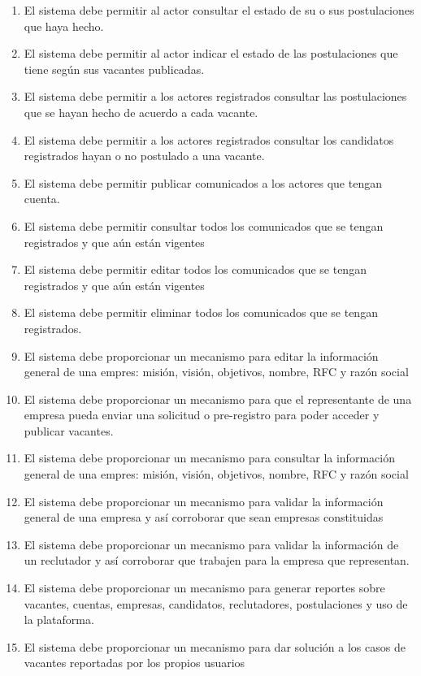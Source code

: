 \begin{enumerate}
        \item El sistema debe permitir al actor consultar el estado de su o sus postulaciones que haya hecho.
        \item El sistema debe permitir al actor indicar  el estado de las postulaciones que tiene según sus vacantes publicadas.
        \item El sistema debe permitir a los actores registrados consultar las postulaciones que se hayan hecho de acuerdo a cada vacante.
        \item El sistema debe permitir a los actores registrados consultar los candidatos registrados hayan o no postulado a una vacante.
        \item El sistema debe permitir publicar comunicados a los actores que tengan cuenta. 
        \item El sistema debe permitir consultar todos los comunicados que se tengan registrados y que aún están vigentes
        \item El sistema debe permitir editar todos los comunicados que se tengan registrados y que aún están vigentes
        \item El sistema debe permitir eliminar todos los comunicados que se tengan registrados.
        \item El sistema debe proporcionar un mecanismo para editar la información general de una empres: misión, visión, objetivos, nombre, RFC  y razón social
        \item El sistema debe proporcionar un mecanismo para que el representante de una empresa pueda enviar una solicitud o pre-registro para poder acceder y publicar vacantes.
        \item El sistema debe proporcionar un mecanismo para consultar la información general de una empres: misión, visión, objetivos, nombre, RFC  y razón social
        \item El sistema debe proporcionar un mecanismo para validar la información general de una empresa y así corroborar que sean empresas constituidas
        \item El sistema debe proporcionar un mecanismo para validar la información de un reclutador y así corroborar que trabajen para la empresa que representan.
        \item El sistema debe proporcionar un mecanismo para generar reportes sobre vacantes, cuentas, empresas, candidatos, reclutadores, postulaciones y uso de la plataforma.
        \item El sistema debe proporcionar un mecanismo para dar solución a los casos de vacantes reportadas por los propios usuarios

\end{enumerate}
